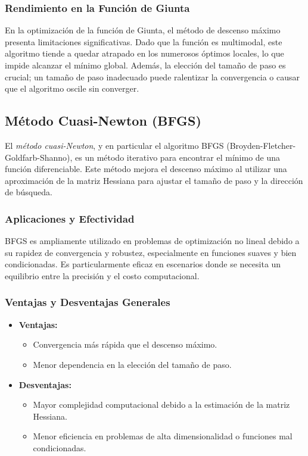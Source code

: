 \documentclass[fontsize=10pt]{article}
\begin{document}
\subsubsection{Rendimiento en la Función de Giunta}

En la optimización de la función de Giunta, el método de descenso máximo presenta limitaciones significativas. Dado que la función es multimodal, este algoritmo tiende a quedar atrapado en los numerosos óptimos locales, lo que impide alcanzar el mínimo global. Además, la elección del tamaño de paso es crucial; un tamaño de paso inadecuado puede ralentizar la convergencia o causar que el algoritmo oscile sin converger.

\subsection{Método Cuasi-Newton (BFGS)}

El \textit{método cuasi-Newton}, y en particular el algoritmo BFGS (Broyden-Fletcher-Goldfarb-Shanno), es un método iterativo para encontrar el mínimo de una función diferenciable. Este método mejora el descenso máximo al utilizar una aproximación de la matriz Hessiana para ajustar el tamaño de paso y la dirección de búsqueda.

\subsubsection{Aplicaciones y Efectividad}

BFGS es ampliamente utilizado en problemas de optimización no lineal debido a su rapidez de convergencia y robustez, especialmente en funciones suaves y bien condicionadas. Es particularmente eficaz en escenarios donde se necesita un equilibrio entre la precisión y el costo computacional.

\subsubsection{Ventajas y Desventajas Generales}

\begin{itemize}
    \item \textbf{Ventajas:} 
    \begin{itemize}
        \item Convergencia más rápida que el descenso máximo.
        \item Menor dependencia en la elección del tamaño de paso.
    \end{itemize}
    \item \textbf{Desventajas:} 
    \begin{itemize}
        \item Mayor complejidad computacional debido a la estimación de la matriz Hessiana.
        \item Menor eficiencia en problemas de alta dimensionalidad o funciones mal condicionadas.
    \end{itemize}
\end{itemize}
\end{document}
